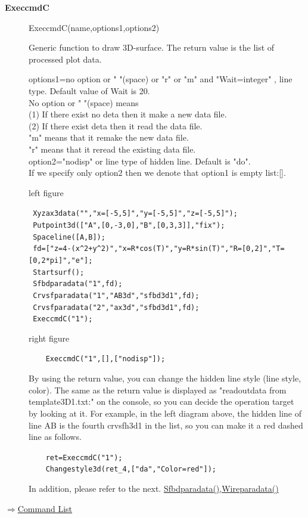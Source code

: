 \documentclass[papersize,a4paper,12pt]{article}
\newenvironment{cmd}[2]{
\hypertarget{#2}{}
\begin{center}{\bf\large #1}\end{center}
\begin{description}
}{
\end{description}
\begin{flushright} \hyperlink{functionlist}{$\Rightarrow$Command List}\end{flushright}
}
\newcommand{\itemket}[1]{
\item[\Ltab{27mm}{#1}]
}
\begin{document}
\begin{cmd}{ExeccmdC}{execcmdc}

\itemket{Usage}ExeccmdC(name,options1,options2)
\itemket{Description}Generic function to draw 3D-surface. The return value is the list of processed plot data.
\itemket{Details}options1=no option or " "(space) or "r" or "m" and "Wait=integer" , line type. Default value of Wait is 20.\\
No option or " "(space) means\\
(1) If there exist no deta then it make a new data file.\\
(2) If there exist deta then it read the data file.\\
"m" means that it remake the new data file.\\
"r" means that it reread the existing data file.\\

option2="nodisp" or line type of hidden line. Default is "do".\\

If we specify only option2 then we denote that option1 is empty list:[].
\itemket{Examples}  \mbox{}

left figure

\verb| Xyzax3data("","x=[-5,5]","y=[-5,5]","z=[-5,5]"); |\\
\verb| Putpoint3d(["A",[0,-3,0],"B",[0,3,3]],"fix"); |\\
\verb| Spaceline([A,B]); |\\
\verb| fd=["z=4-(x^2+y^2)","x=R*cos(T)","y=R*sin(T)","R=[0,2]","T=[0,2*pi]","e"]; |\\
\verb| Startsurf(); |\\
\verb| Sfbdparadata("1",fd); |\\
\verb| Crvsfparadata("1","AB3d","sfbd3d1",fd); |\\
\verb| Crvsfparadata("2","ax3d","sfbd3d1",fd); |\\
\verb| ExeccmdC("1"); |

right figure

\verb|    ExeccmdC("1",[],["nodisp"]);|

\hspace{20mm} \hspace{20mm}    

By using the return value, you can change the hidden line style (line style, color). 
The same as the return value is displayed as "readoutdata from template3D1.txt:" on the console, so you can decide the operation target by looking at it. For example, in the left diagram above, the hidden line of line AB is the fourth crvsfh3d1 in the list, so you can make it a red dashed line as follows.

\verb|    ret=ExeccmdC("1");|\\
\verb|    Changestyle3d(ret_4,["da","Color=red"]);|\\

\hspace{20mm} 

In addition, please refer to the next. \hyperlink{sfbdparadata}{Sfbdparadata()},\hyperlink{wireparadata}{Wireparadata()} 

\end{cmd}
\end{document}
